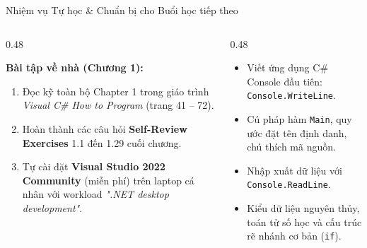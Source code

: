 \documentclass[aspectratio=169, 10pt]{beamer}
\begin{document}
\begin{frame}{Nhiệm vụ Tự học \& Chuẩn bị cho Buổi học tiếp theo}
  \begin{columns}[T]
    \begin{column}{0.48\textwidth}
      \begin{block}{\textbf{Bài tập về nhà (Chương 1):}}
        \begin{enumerate}
          \item Đọc kỹ toàn bộ Chapter 1 trong giáo trình \textit{Visual C\# How to Program} (trang 41 -- 72).
          \item Hoàn thành các câu hỏi \textbf{Self-Review Exercises} 1.1 đến 1.29 cuối chương.
          \item Tự cài đặt \textbf{Visual Studio 2022 Community} (miễn phí) trên laptop cá nhân với workload \textit{".NET desktop development"}.
        \end{enumerate}
      \end{block}
    \end{column}
    \begin{column}{0.48\textwidth}
      \begin{tcolorbox}[colback=CSharpPurple!10,colframe=CSharpPurple,title=\textbf{Đọc trước Chương 2: Nhập môn Cú pháp C\#}]
        \begin{itemize}
          \item Viết ứng dụng C\# Console đầu tiên: \texttt{Console.WriteLine}.
          \item Cú pháp hàm \texttt{Main}, quy ước đặt tên định danh, chú thích mã nguồn.
          \item Nhập xuất dữ liệu với \texttt{Console.ReadLine}.
          \item Kiểu dữ liệu nguyên thủy, toán tử số học và cấu trúc rẽ nhánh cơ bản (\texttt{if}).
        \end{itemize}
      \end{tcolorbox}
    \end{column}
  \end{columns}
\end{frame}
\end{document}
